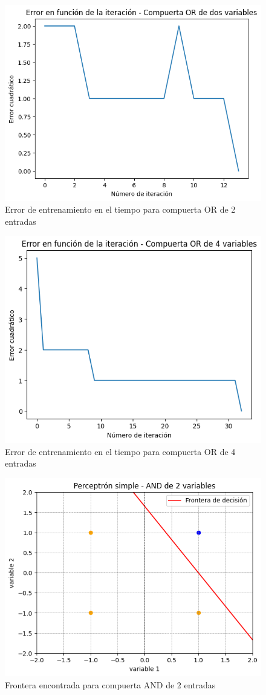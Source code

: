 \documentclass[11pt]{article} %
\begin{document}
\begin{figure}[h!]
	\centering
	\includegraphics[width=0.7\linewidth]{../imgs/ej1/OR2err}
	\caption[]{Error de entrenamiento en el tiempo para compuerta OR de 2 entradas}
	\label{fig:or2err}
\end{figure}

\begin{figure}[h!]
	\centering
	\includegraphics[width=0.7\linewidth]{../imgs/ej1/OR4}
	\caption[]{Error de entrenamiento en el tiempo para compuerta OR de 4 entradas}
	\label{fig:or4}
\end{figure}

\begin{figure}[h!]
	\centering
	\includegraphics[width=0.7\linewidth]{../imgs/ej1/ANDFRONT}
	\caption[]{Frontera encontrada para compuerta AND de 2 entradas}
	\label{fig:frontAND}
\end{figure}
\end{document}
